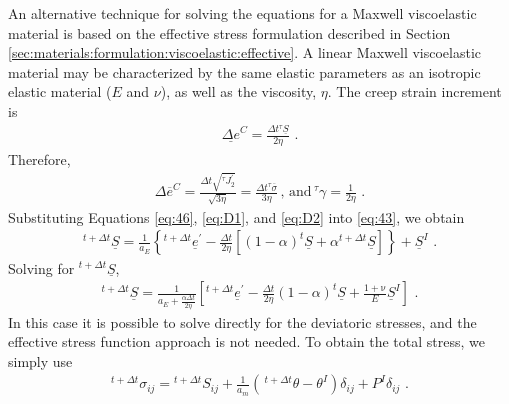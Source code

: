 An alternative technique for solving the equations for a Maxwell viscoelastic
material is based on the effective stress formulation described in
Section \vref{sec:materials:formulation:viscoelastic:effective}. A linear
Maxwell viscoelastic material may be characterized by the same elastic
parameters as an isotropic elastic material ($E$ and $\nu$), as
well as the viscosity, $\eta$. The creep strain increment is
\begin{gather}
\underline{\Delta e}^{C}=\frac{\Delta t\phantom{}^{\tau}\underline{S}}{2\eta}\,\,.\label{eq:D1}
\end{gather}
Therefore,
\begin{gather}
\Delta\overline{e}^{C}=\frac{\Delta t\sqrt{^{\tau}J_{2}^{\prime}}}{\sqrt{3\eta}}=\frac{\Delta t\phantom{}^{\tau}\overline{\sigma}}{3\eta}\,,\,\mathrm{and}\,^{\tau}\gamma=\frac{1}{2\eta}\,\,.\label{eq:D2}
\end{gather}
Substituting Equations \vref{eq:46}, \vref{eq:D1}, and \vref{eq:D2}
into \vref{eq:43}, we obtain
\begin{gather}
^{t+\Delta t}\underline{S}=\frac{1}{a_{E}}\left\{ ^{t+\Delta t}\underline{e}^{\prime}-\frac{\Delta t}{2\eta}\left[(1-\alpha)^{t}\underline{S}+\alpha\phantom{}^{t+\Delta t}\underline{S}\right]\right\} +\underline{S}^{I}\,\,.\label{eq:D3}
\end{gather}
Solving for $^{t+\Delta t}\underline{S}$,
\begin{gather}
^{t+\Delta t}\underline{S}=\frac{1}{a_{E}+\frac{\alpha\Delta t}{2\eta}}\left[^{t+\Delta t}\underline{e}^{\prime}-\frac{\Delta t}{2\eta}(1-\alpha)^{t}\underline{S}+\frac{1+\mathrm{\nu}}{E}\underline{S}^{I}\right]\,\,.\label{eq:D4}
\end{gather}
In this case it is possible to solve directly for the deviatoric stresses,
and the effective stress function approach is not needed. To obtain
the total stress, we simply use
\begin{gather}
^{t+\Delta t}\sigma_{ij}=\phantom{}^{t+\Delta t}S_{ij}+\frac{\mathit{1}}{a_{m}}\left(\,^{t+\Delta t}\theta-\theta^{I}\right)\delta_{ij}+P^{I}\delta_{ij}\,\,.\label{eq:D5}
\end{gather}


